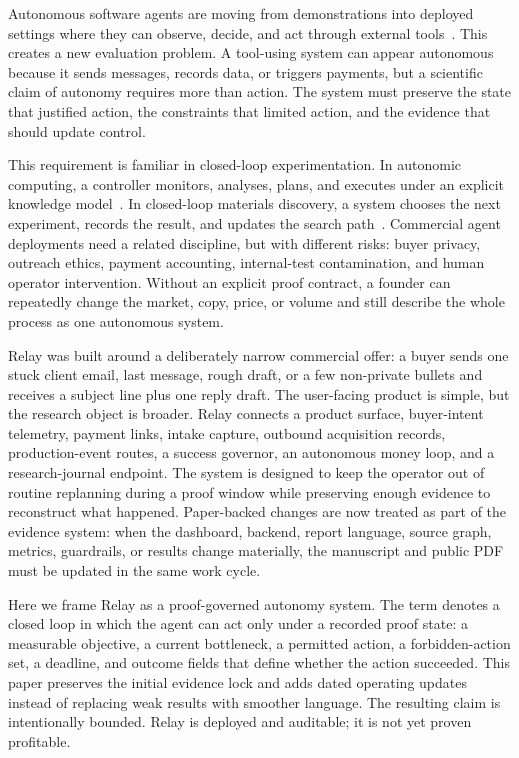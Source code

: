 \documentclass[12pt,letterpaper]{article}
\begin{document}
Autonomous software agents are moving from demonstrations into deployed settings where they can observe, decide, and act through external tools~\cite{yao_react_2023,schick_toolformer_2023,park_generative_2023,wu_autogen_2023,wang_survey_2023}. This creates a new evaluation problem. A tool-using system can appear autonomous because it sends messages, records data, or triggers payments, but a scientific claim of autonomy requires more than action. The system must preserve the state that justified action, the constraints that limited action, and the evidence that should update control.

This requirement is familiar in closed-loop experimentation. In autonomic computing, a controller monitors, analyses, plans, and executes under an explicit knowledge model~\cite{kephart_vision_2003}. In closed-loop materials discovery, a system chooses the next experiment, records the result, and updates the search path~\cite{kusne_closed_loop_2020}. Commercial agent deployments need a related discipline, but with different risks: buyer privacy, outreach ethics, payment accounting, internal-test contamination, and human operator intervention. Without an explicit proof contract, a founder can repeatedly change the market, copy, price, or volume and still describe the whole process as one autonomous system.

Relay was built around a deliberately narrow commercial offer: a buyer sends one stuck client email, last message, rough draft, or a few non-private bullets and receives a subject line plus one reply draft. The user-facing product is simple, but the research object is broader. Relay connects a product surface, buyer-intent telemetry, payment links, intake capture, outbound acquisition records, production-event routes, a success governor, an autonomous money loop, and a research-journal endpoint. The system is designed to keep the operator out of routine replanning during a proof window while preserving enough evidence to reconstruct what happened. Paper-backed changes are now treated as part of the evidence system: when the dashboard, backend, report language, source graph, metrics, guardrails, or results change materially, the manuscript and public PDF must be updated in the same work cycle.

Here we frame Relay as a proof-governed autonomy system. The term denotes a closed loop in which the agent can act only under a recorded proof state: a measurable objective, a current bottleneck, a permitted action, a forbidden-action set, a deadline, and outcome fields that define whether the action succeeded. This paper preserves the initial evidence lock and adds dated operating updates instead of replacing weak results with smoother language. The resulting claim is intentionally bounded. Relay is deployed and auditable; it is not yet proven profitable.
\end{document}
